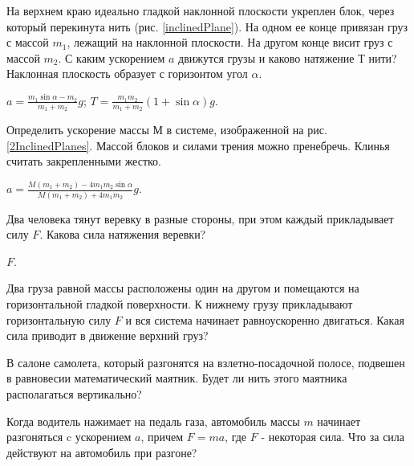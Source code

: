 \begin{ex} %
На верхнем краю идеально гладкой наклонной плоскости укреплен блок, через который перекинута нить (рис. \ref{inclinedPlane}). На одном ее конце привязан груз с массой $m_1$, лежащий на наклонной плоскости. На другом конце висит груз с массой $m_2$. С каким ускорением $a$ движутся грузы и каково натяжение $Т$ нити? Наклонная плоскость образует с горизонтом угол $\alpha$.
\begin{ans}
$a = \frac{m_1 \sin \alpha - m_2}{m_1 + m_2}g$; $T = \frac{m_1 m_2}{m_1 + m_2}\left( 1+ \sin \alpha \right)g$.
\end{ans}
\end{ex}

\begin{ex} %
Определить ускорение массы $М$ в системе, изображенной на рис. \ref{2InclinedPlanes}. Массой блоков и силами трения можно пренебречь. Клинья считать закрепленными жестко.
\begin{ans}
$a = \frac{M(m_1 + m_2) - 4 m_1 m_2 \sin \alpha}{M(m_1 + m_2) + 4 m_1 m_2}g$.
\end{ans}
\end{ex}

\qualProblems

\begin{ex} %
Два человека тянут веревку в разные стороны, при этом каждый прикладывает силу $F$. Какова сила натяжения веревки?
\begin{ans}
$F$.
\end{ans}
\end{ex}

\begin{ex} %
Два груза равной массы расположены один на другом и помещаются на горизонтальной гладкой поверхности. К нижнему грузу прикладывают горизонтальную силу $F$ и вся система начинает равноускоренно двигаться. Какая сила приводит в движение верхний груз?
\end{ex}

\begin{ex} %
В салоне самолета, который разгонятся на взлетно-посадочной полосе, подвешен в равновесии математический маятник. Будет ли нить этого маятника располагаться вертикально?
\end{ex}

\begin{ex} %
Когда водитель нажимает на педаль газа, автомобиль массы $m$ начинает разгоняться c ускорением $a$, причем $F = ma$, где $F$ - некоторая сила. Что за сила действуют на автомобиль при разгоне?
\end{ex}

